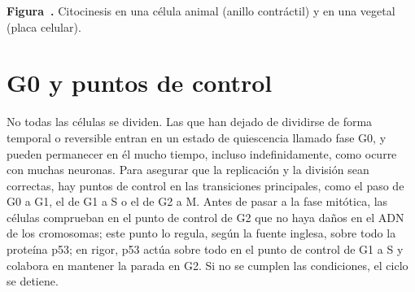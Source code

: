 \documentclass{book}
\newcounter{studiumfigure}
\begin{document}
\begin{minipage}{\linewidth}
%
\fi
\fi
\endgroup
\par\nopagebreak
{\small {}\label{fig:citocinesis-animal-vegetal}\textbf{Figura~\thestudiumfigure.} Citocinesis en una célula animal (anillo contráctil) y en una vegetal (placa celular).\par}
\end{minipage}
\par\vspace{\baselineskip}

\section{G0 y puntos de control}

No todas las células se dividen. Las que han dejado de dividirse de forma temporal o reversible entran en un estado de quiescencia llamado fase G0, y pueden permanecer en él mucho tiempo, incluso indefinidamente, como ocurre con muchas neuronas. Para asegurar que la replicación y la división sean correctas, hay puntos de control en las transiciones principales, como el paso de G0 a G1, el de G1 a S o el de G2 a M. Antes de pasar a la fase mitótica, las células comprueban en el punto de control de G2 que no haya daños en el ADN de los cromosomas; este punto lo regula, según la fuente inglesa, sobre todo la proteína p53; en rigor, p53 actúa sobre todo en el punto de control de G1 a S y colabora en mantener la parada en G2. Si no se cumplen las condiciones, el ciclo se detiene.
\end{document}
